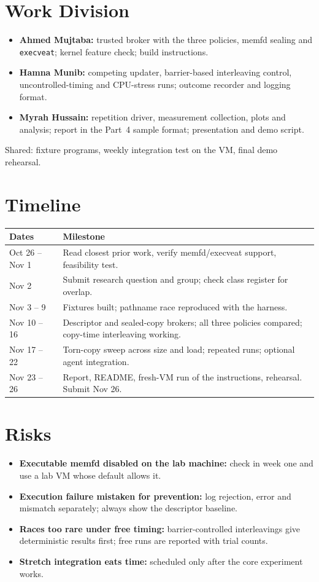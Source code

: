 \documentclass[11pt,a4paper]{article}
\begin{document}
\section{Work Division}
\begin{itemize}
  \item \textbf{Ahmed Mujtaba:} trusted broker with the three policies, memfd sealing and \texttt{execveat}; kernel feature check; build instructions.
  \item \textbf{Hamna Munib:} competing updater, barrier-based interleaving control, uncontrolled-timing and CPU-stress runs; outcome recorder and logging format.
  \item \textbf{Myrah Hussain:} repetition driver, measurement collection, plots and analysis; report in the Part~4 sample format; presentation and demo script.
\end{itemize}
Shared: fixture programs, weekly integration test on the VM, final demo rehearsal.

\section{Timeline}
\begin{tabular}{l p{11.5cm}}
\toprule
\textbf{Dates} & \textbf{Milestone} \\
\midrule
Oct 26 -- Nov 1 & Read closest prior work, verify memfd/execveat support, feasibility test. \\
Nov 2 & Submit research question and group; check class register for overlap. \\
Nov 3 -- 9 & Fixtures built; pathname race reproduced with the harness. \\
Nov 10 -- 16 & Descriptor and sealed-copy brokers; all three policies compared; copy-time interleaving working. \\
Nov 17 -- 22 & Torn-copy sweep across size and load; repeated runs; optional agent integration. \\
Nov 23 -- 26 & Report, README, fresh-VM run of the instructions, rehearsal. Submit Nov 26. \\
\bottomrule
\end{tabular}

\section{Risks}
\begin{itemize}
  \item \textbf{Executable memfd disabled on the lab machine:} check in week one and use a lab VM whose default allows it.
  \item \textbf{Execution failure mistaken for prevention:} log rejection, error and mismatch separately; always show the descriptor baseline.
  \item \textbf{Races too rare under free timing:} barrier-controlled interleavings give deterministic results first; free runs are reported with trial counts.
  \item \textbf{Stretch integration eats time:} scheduled only after the core experiment works.
\end{itemize}
\end{document}
